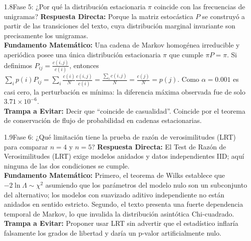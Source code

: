 \documentclass[11pt,letterpaper]{article}
\begin{document}
\begin{qbox}{1.8}{Fase 5: ¿Por qué la distribución estacionaria $\pi$ coincide con las frecuencias de unigramas?}
\textbf{Respuesta Directa:} Porque la matriz estocástica $P$ se construyó a partir de las transiciones del texto, cuya distribución marginal invariante son precisamente los unigramas.\\[3pt]
\textbf{Fundamento Matemático:} Una cadena de Markov homogénea irreducible y aperiódica posee una única distribución estacionaria $\pi$ que cumple $\pi P = \pi$. Si definimos $P_{ij} = \frac{c(i,j)}{c(i)}$, entonces $\sum_i p(i) P_{ij} = \sum_i \frac{c(i)}{N} \frac{c(i,j)}{c(i)} = \frac{\sum_i c(i,j)}{N} = \frac{c(j)}{N} = p(j)$. Como $\alpha=0.001$ es casi cero, la perturbación es mínima: la diferencia máxima observada fue de solo $3.71 \times 10^{-6}$.\\[3pt]
\textbf{Trampa a Evitar:} Decir que ``coincide de casualidad''. Coincide por el teorema de conservación de flujo de probabilidad en cadenas estacionarias.
\end{qbox}

\begin{qbox}{1.9}{Fase 6: ¿Qué limitación tiene la prueba de razón de verosimilitudes (LRT) para comparar $n=4$ y $n=5$?}
\textbf{Respuesta Directa:} El Test de Razón de Verosimilitudes (LRT) exige modelos anidados y datos independientes IID; aquí ninguna de las dos condiciones se cumple.\\[3pt]
\textbf{Fundamento Matemático:} Primero, el teorema de Wilks establece que $-2\ln\Lambda \sim \chi^2$ asumiendo que los parámetros del modelo nulo son un subconjunto del alternativo; los modelos con suavizado aditivo independiente no están anidados en sentido estricto. Segundo, el texto presenta una fuerte dependencia temporal de Markov, lo que invalida la distribución asintótica Chi-cuadrado.\\[3pt]
\textbf{Trampa a Evitar:} Proponer usar LRT sin advertir que el estadístico inflaría falsamente los grados de libertad y daría un p-valor artificialmente nulo.
\end{qbox}
\end{document}
